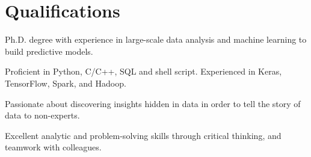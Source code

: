 \documentclass[letterpaper]{deedy-resume-openfont}
\begin{document}
\section{Qualifications}
\location{}
\vspace{-0.4cm}
\begin{tightemize}
\item Ph.D. degree with experience in large-scale data analysis and machine learning to build predictive models.
\item Proficient in Python, C/C++, SQL and shell script. Experienced in Keras, TensorFlow, Spark, and Hadoop.
\item Passionate about discovering insights hidden in data in order to tell the story of data to non-experts.
\item Excellent analytic and problem-solving skills through critical thinking, and teamwork with colleagues.
\end{tightemize}

\end{document}
